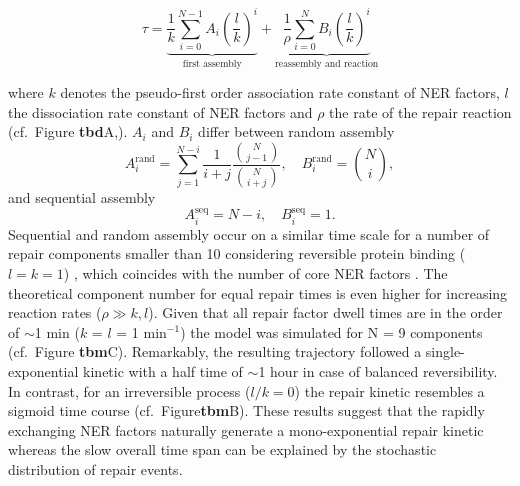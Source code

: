 \begin{equation}
\tau = \underbrace{\frac{1}{k}\sum^{N-1}_{i=0}A_i\left(\frac{l}{k}\right)^i}_{\text{first assembly}} +  \underbrace{\frac{1}{\rho}\sum_{i=0}^{N}B_i \left(\frac{l}{k}\right)^i}_{\text{reassembly and reaction}} \label{Eqn:taugen}
\end{equation}

where $k$ denotes the pseudo-first order association rate constant of NER factors, $l$ the dissociation rate constant of NER factors and $\rho$ the rate of the repair reaction (cf.\ Figure \textbf{tbd}A,\cite{Verbruggen2014}). $A_i$ and $B_i$ differ between random assembly
\begin{equation}
A_i^\text{rand}= \sum_{j=1}^{N-i}\frac{1}{i+j}\frac{{N \choose j-1}}{{N\choose i+j}} , \quad B_i^\text{rand} = {N\choose i},\label{Eqn:coefrand}
\end{equation} 
and sequential assembly           
\begin{equation}
A_i^\text{seq}= N-i , \quad B_i^\text{seq} = 1.\label{Eqn.coefseq}
\end{equation}
Sequential and random assembly occur on a similar time scale for a number of repair components smaller than 10 considering reversible protein binding ($l=k=1$) \cite{Terstiege2010}, which coincides with the number of core NER factors \cite{Luijsterburg2010}. The theoretical component number for equal repair times is even higher for increasing reaction rates ($\rho \gg k,l$). Given that all repair factor dwell times are in the order of $\sim$1 min ($k$ = $l$ = 1 $\text{min}^{-\text{1}}$) the model was simulated for N = 9 components (cf.\ Figure \textbf{tbm}C). Remarkably, the resulting trajectory followed a single-exponential kinetic with a half time of $\sim$1 hour in case of balanced reversibility. In contrast, for an irreversible process ($l/k = 0$) the repair kinetic resembles a sigmoid time course (cf.\ Figure\textbf{tbm}B). These results suggest that the rapidly exchanging NER factors naturally generate a mono-exponential repair kinetic whereas the slow overall time span can be explained by the stochastic distribution of repair events.

